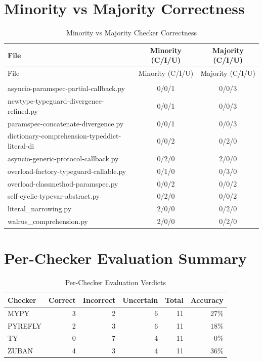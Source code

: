 \documentclass{article}
\begin{document}
\section{Minority vs Majority Correctness}
\begin{longtable}{p{5cm}cc}
\caption{Minority vs Majority Checker Correctness}\label{tab:minority}\\
\toprule
File & Minority (C/I/U) & Majority (C/I/U) \\
\midrule
\endfirsthead
\toprule
File & Minority (C/I/U) & Majority (C/I/U) \\
\midrule
\endhead
\bottomrule
\endlastfoot
\multicolumn{3}{l}{\textit{Note: C=Correct, I=Incorrect, U=Uncertain}} \\
asyncio-paramspec-partial-callback.py & 0/0/1 & 0/0/3 \\
newtype-typeguard-divergence-refined.py & 0/0/1 & 0/0/3 \\
paramspec-concatenate-divergence.py & 0/0/1 & 0/0/3 \\
dictionary-comprehension-typeddict-literal-di & 0/0/2 & 0/2/0 \\
asyncio-generic-protocol-callback.py & 0/2/0 & 2/0/0 \\
overload-factory-typeguard-callable.py & 0/1/0 & 0/3/0 \\
overload-classmethod-paramspec.py & 0/0/2 & 0/0/2 \\
self-cyclic-typevar-abstract.py & 0/2/0 & 0/0/2 \\
literal\_narrowing.py & 2/0/0 & 0/2/0 \\
walrus\_comprehension.py & 2/0/0 & 0/2/0 \\
\bottomrule
\end{longtable}

\section{Per-Checker Evaluation Summary}
\begin{table}[htbp]
\centering
\begin{tabular}{lrrrrr}
\toprule
Checker & Correct & Incorrect & Uncertain & Total & Accuracy \\
\midrule
MYPY & 3 & 2 & 6 & 11 & 27\% \\
PYREFLY & 2 & 3 & 6 & 11 & 18\% \\
TY & 0 & 7 & 4 & 11 & 0\% \\
ZUBAN & 4 & 3 & 4 & 11 & 36\% \\
\bottomrule
\end{tabular}
\caption{Per-Checker Evaluation Verdicts}
\label{tab:verdicts}
\end{table}
\end{document}
